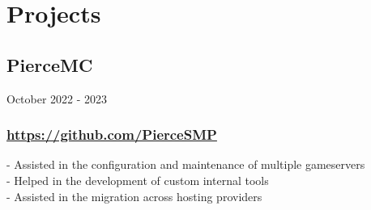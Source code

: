 \newpage

\section{Projects}

\subsection{PierceMC} October 2022 - 2023 \\
\subsubsection{\href{https://github.com/PierceSMP}{https://github.com/PierceSMP}}
-\:  Assisted in the configuration and maintenance of multiple gameservers \\
-\:  Helped in the development of custom internal tools \\
-\:  Assisted in the migration across hosting providers \\



